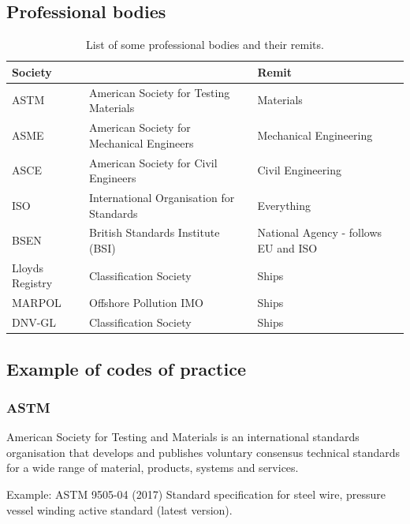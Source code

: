\subsection{Professional bodies}
\begin{table}[H]
    \centering
    \begin{tabular}{@{}lll@{}}
        \toprule
        \textbf{Society} &                                           & \textbf{Remit}                       \\
        \midrule
        ASTM             & American Society for Testing Materials    & Materials                            \\
        ASME             & American Society for Mechanical Engineers & Mechanical Engineering               \\
        ASCE             & American Society for Civil Engineers      & Civil Engineering                    \\
        ISO              & International Organisation for Standards  & Everything                           \\
        BSEN             & British Standards Institute (BSI)         & National Agency - follows EU and ISO \\
        Lloyds Registry  & Classification Society                    & Ships                                \\
        MARPOL           & Offshore Pollution IMO                    & Ships                                \\
        DNV-GL           & Classification Society                    & Ships                                \\
        \bottomrule
    \end{tabular}
    \caption{List of some professional bodies and their remits.}
\end{table}
\subsection{Example of codes of practice}
\subsubsection{ASTM}
American Society for Testing and Materials is an international standards organisation that develops and publishes voluntary consensus technical standards for a wide range of material, products, systems and services.

Example: ASTM 9505-04 (2017) Standard specification for steel wire, pressure vessel winding active standard (latest version).

